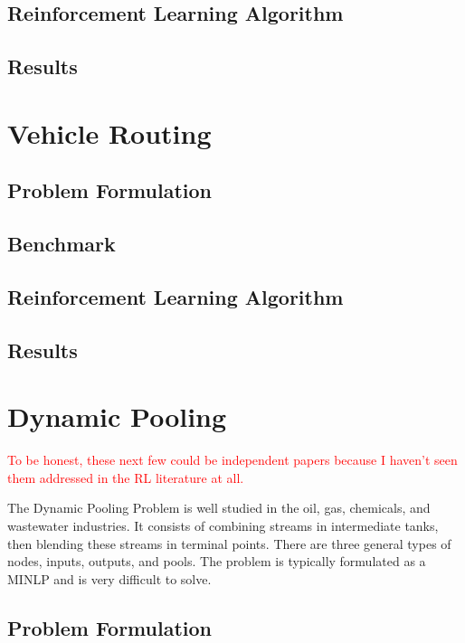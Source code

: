 \documentclass[12pt]{article}
\begin{document}
\subsection{Reinforcement Learning Algorithm}

\subsection{Results}

\section{Vehicle Routing}

\subsection{Problem Formulation}

\subsection{Benchmark}

\subsection{Reinforcement Learning Algorithm}

\subsection{Results}

\section{Dynamic Pooling}

\textcolor{red}{To be honest, these next few could be independent papers because I haven't seen them addressed in the RL literature at all.}

The Dynamic Pooling Problem is well studied in the oil, gas, chemicals, and wastewater industries.
It consists of combining streams in intermediate tanks, then blending these streams in terminal points.
There are three general types of nodes, inputs, outputs, and pools.
The problem is typically formulated as a MINLP and is very difficult to solve.


\subsection{Problem Formulation}
\end{document}

